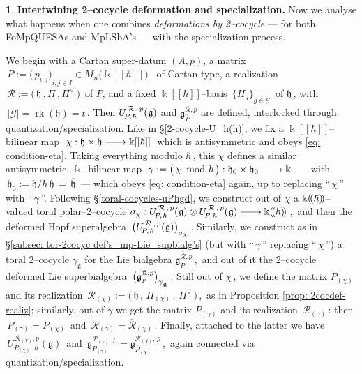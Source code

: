 \documentclass[12pt,reqno,twoside,a4paper]{amsart}
\numberwithin{equation}{section}
\theoremstyle{definition}
\newtheorem{free text}[lema]{}
\theoremstyle{remark}
\newcommand \rk{\operatorname{rk}}
\newcommand{\R}{{\mathcal R}}
\newcommand{\G}{{\mathcal G}}
\def \kh{{\Bbbk[[\hbar]]}}
\def \khp{{\Bbbk(\hskip-1,7pt(\hbar)\hskip-1,7pt)}}
\def \G {\mathcal{G}}
\def \Ppicc {{\scriptscriptstyle P}}
\def \Rpicc {{\scriptscriptstyle \R}}
\def \lieg{\mathfrak{g}}
\def \lieh{\mathfrak{h}}
\def \uRpPhg{U^{\,\R\,,\,p}_{\!P,\hskip0,7pt\hbar}(\hskip0,5pt\lieg)}
\theoremstyle{plain}
\begin{document}
\begin{free text}
%
 \textbf{Intertwining 2--cocycle deformation and specialization.}
%
 Now we analyse what happens when one combines  \textsl{deformations by 2--cocycle}
 --- for both FoMpQUESAs and MpLSbA's ---   with the specialization process.
                                                                   \par
   We begin with a Cartan super-datum $(A,p)$, a matrix
   $ \, P \! := \! {\big(\, p_{i,j} \big)}_{i, j \in I} \in M_n\big( \kh \big) $  \,
   of Cartan type, a realization
   $ \, \R := \big(\, \lieh \, , \Pi \, , \Pi^\vee \,\big) \, $
   of  $ P $,  and a fixed  $ \kh $--basis  $ \, {\big\{ H_g \big\}}_{g \in \G} \, $
%
of  $ \lieh \, $,  with  $ \, |\G| = \rk(\lieh) = t \, $.
Then  $ \uRpPhg $  and  $ \lieg^{{\bar{\Rpicc}},p}_{\bar{\Ppicc}} $
are defined, interlocked through quantization/specialization.
%
 \vskip5pt
%
   Like in  \S \ref{2-cocycle-U_h(h)},  we fix a  $ \kh $--bilinear
   map  $ \; \chi : \lieh \times \lieh \relbar\joinrel\longrightarrow \kh \; $
   which is antisymmetric and obeys  \eqref{eq: condition-eta}.
   Taking everything modulo  $ \hbar \, $,  this  $ \chi $
   defines a similar antisymmetric,  $ \Bbbk $--bilinear  map
   $ \; \gamma := \big(\, \chi \!\mod \hbar \,\big) : \lieh_0 \times
   \lieh_0 \relbar\joinrel\longrightarrow \Bbbk \; $
   --- with  $ \, \lieh_0 := \lieh \Big/ \hbar \, \lieh \, = \,
   \overline{\lieh} \, $  ---   which obeys  \eqref{eq: condition-eta}
   again, up to replacing  ``$ \, \chi \, $''  with  ``$ \, \gamma \, $''.
   Following  \S \ref{toral-cocycles-uPhgd},  we construct out of
   $ \chi $  a  $ \khp $--valued  toral  polar--$ 2 $--cocycle
   $ \sigma_\chi : \uRpPhg \otimes \uRpPhg \relbar\joinrel\longrightarrow \khp \, $,
   \,and then the deformed Hopf superalgebra  $ \, {\big( \uRpPhg \big)}_{\sigma_\chi} \, $.
   Similarly, we construct as in  \S \ref{subsec: tor-2cocyc def's_mp-Lie_supbialg's}
   (but with  ``$ \, \gamma \, $''  replacing  ``$ \, \chi \, $'')  a toral  $ 2 $--cocycle
   $ \gamma_\lieg $  for the Lie bialgebra  $ \lieg^{{\bar{\Rpicc}},p}_{\bar{\Ppicc}} \, $,
   \,and out of it the  $ 2 $--cocycle  deformed Lie superbialgebra
   $ \, {\big( \lieg^{{\bar{\Rpicc}},p}_{\bar{\Ppicc}} \big)}_{\gamma\raisebox{-1pt}{$ {}_\lieg $}} \, $.
%
 \vskip3pt
%
   Still out of  $ \chi \, $,  we define the matrix  $ P_{(\chi)} $
   and its realization  $ \, \R_{(\chi)} := \big(\, \lieh \, , \, \Pi_{(\chi)} \, ,
   \, \Pi^\vee \,\big) \, $,  \,as in  Proposition \ref{prop: 2cocdef-realiz};
   similarly, out of  $ \gamma $  we get the matrix  $ P_{(\gamma)} $
   and its realization  $ \, \R_{(\gamma)} \, $:  then
   $ \, P_{(\gamma)} = \bar{P}_{(\chi)} \, $  and
   $ \, \R_{(\gamma)} = \bar{\R}_{(\chi)} \, $.
   Finally, attached to the latter we have
   $ \, U_{\!P_{(\chi)},\,\hbar}^{\,\R_{(\chi)},p}(\lieg) \, $  and
   $ \, \lieg^{\Rpicc_{(\gamma)},\,p}_{\Ppicc_{(\gamma)}} =
   \lieg^{\bar{\Rpicc}_{(\chi)},\,p}_{\bar{\Ppicc}_{(\chi)}} \, $,
   \,again connected via quantization/specialization.
%
\end{free text}
\end{document}

